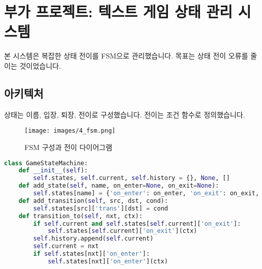 \section{부가 프로젝트: 텍스트 게임 상태 관리 시스템}

본 시스템은 복잡한 상태 전이를 FSM으로 관리했습니다.
목표는 상태 전이 오류를 줄이는 것이었습니다.

\subsection{아키텍처}
상태는 이름, 입장, 퇴장, 전이로 구성했습니다.
전이는 조건 함수로 정의했습니다.

\begin{figure}[H]
    \centering
    \texttt{[image: images/4\_fsm.png]}
    \caption{FSM 구성과 전이 다이어그램}
    \label{fig:fsm}
\end{figure}

\begin{lstlisting}[language=Python]
class GameStateMachine:
    def __init__(self):
        self.states, self.current, self.history = {}, None, []
    def add_state(self, name, on_enter=None, on_exit=None):
        self.states[name] = {'on_enter': on_enter, 'on_exit': on_exit, 'trans': {}}
    def add_transition(self, src, dst, cond):
        self.states[src]['trans'][dst] = cond
    def transition_to(self, nxt, ctx):
        if self.current and self.states[self.current]['on_exit']:
            self.states[self.current]['on_exit'](ctx)
        self.history.append(self.current)
        self.current = nxt
        if self.states[nxt]['on_enter']:
            self.states[nxt]['on_enter'](ctx)
\end{lstlisting}


